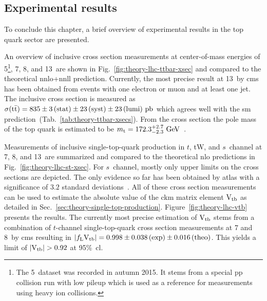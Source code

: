 \subsection{Experimental results}
\label{sec:theory-exp-results}

To conclude this chapter, a brief overview of experimental results in the top quark sector are presented.

An overview of inclusive \ttbar cross section measurements at center-of-mass energies of 5\footnote{The 5~\TeV dataset was recorded in autumn 2015. It stems from a special pp collision run with low pileup which is used as a reference for measurements using heavy ion collisions.}, 7, 8, and 13~\TeV are shown in Fig.~\ref{fig:theory-lhc-ttbar-xsec} and compared to the theoretical \gls{nnlo}+\gls{nnll} prediction. Currently, the most precise result at 13~\TeV by \gls{cms} has been obtained from events with one electron or muon and at least one jet. The inclusive cross section is measured as $\sigma({\mathrm{t}\bar{\mathrm{t}}})=835\pm3\,\mathrm{(stat)}\pm23\,\mathrm{(syst)}\pm23\,\mathrm{(lumi)}~\mathrm{pb}$ which agrees well with the \gls{sm} prediction~(Tab.~\ref{tab:theory-ttbar-xsecs}). From the cross section the pole mass of the top quark is estimated to be $m_\mathrm{t}=172.3^{+2.7}_{-2.3}~\mathrm{GeV}$~\cite{CMS-PAS-TOP-16-006}.

Measurements of inclusive single-top-quark production in $t$, tW, and $s$~channel at 7, 8, and 13~\TeV are summarized and compared to the theoretical \gls{nlo} predictions in Fig.~\ref{fig:theory-lhc-st-xsec}. For $s$~channel, mostly only upper limits on the cross sections are depicted. The only evidence so far has been obtained by \gls{atlas} with a significance of $3.2$ standard deviations~\cite{Aad:2015upn}. All of these cross section measurements can be used to estimate the absolute value of the \gls{ckm} matrix element ${\mathrm{V}_\mathrm{tb}}$ as detailed in Sec.~\ref{sec:theory-single-top-production}. Figure~\ref{fig:theory-lhc-vtb} presents the results. The currently most precise estimation of ${\mathrm{V}_\mathrm{tb}}$ stems from a combination of $t$-channel single-top-quark cross section measurements at 7 and 8~\TeV by \gls{cms} resulting in $|f_\mathrm{L}{\mathrm{V}_\mathrm{tb}}|=0.998\pm0.038\,\mathrm{(exp)}\pm0.016\,\mathrm{(theo)}$. This yields a limit of $|\vtb|>0.92$ at 95\%~\gls{cl}.


